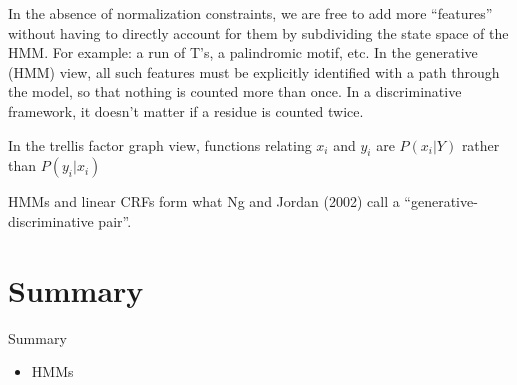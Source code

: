 \documentclass{beamer}
\begin{document}
\begin{frame}{}
\item In the absence of normalization constraints, we are free to add more ``features'' without having to directly account for them by subdividing the state space of the HMM.
For example: a run of T's, a palindromic motif, etc.
In the generative (HMM) view, all such features must be explicitly identified with a path through the model, so that nothing is counted more than once.
In a discriminative framework, it doesn't matter if a residue is counted twice.
\item In the trellis factor graph view, functions relating $x_i$ and $y_i$ are $P(x_i|Y)$ rather than $P(y_i|x_i)$
\item HMMs and linear CRFs form what Ng and Jordan (2002) call a ``generative-discriminative pair''.
\iteme

\end{frame}

\section*{Summary}

\begin{frame}{Summary}

  \begin{itemize}
  \item HMMs
  \end{itemize}

\end{frame}
\end{document}
